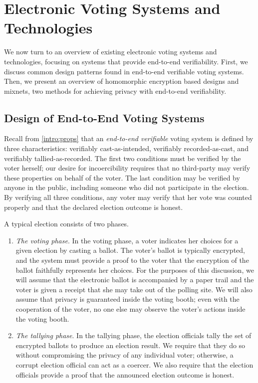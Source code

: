 \chapter{Electronic Voting Systems and Technologies} \label{evote}

We now turn to an overview of existing electronic voting systems and technologies, focusing on systems that provide end-to-end verifiability. First, we discuss common design patterns found in end-to-end verifiable voting systems. Then, we present an overview of homomorphic encryption based designs and mixnets, two methods for achieving privacy with end-to-end verifiability.

\section{Design of End-to-End Voting Systems} \label{evote:design}

Recall from \ref{intro:props} that an \emph{end-to-end verifiable} voting system is defined by three characteristics: verifiably cast-as-intended, verifiably recorded-as-cast, and verifiably tallied-as-recorded. The first two conditions must be verified by the voter herself; our desire for incoercibility requires that no third-party may verify these properties on behalf of the voter. The last condition may be verified by anyone in the public, including someone who did not participate in the election. By verifying all three conditions, any voter may verify that her vote was counted properly and that the declared election outcome is honest.

A typical election consists of two phases.
\begin{enumerate}
\item \emph{The voting phase}. In the voting phase, a voter indicates her choices for a given election by casting a ballot. The voter's ballot is typically encrypted, and the system must provide a proof to the voter that the encryption of the ballot faithfully represents her choices. For the purposes of this discussion, we will assume that the electronic ballot is accompanied by a paper trail and the voter is given a receipt that she may take out of the polling site. We will also assume that privacy is guaranteed inside the voting booth; even with the cooperation of the voter, no one else may observe the voter's actions inside the voting booth.
\item \emph{The tallying phase}. In the tallying phase, the election officials tally the set of encrypted ballots to produce an election result. We require that they do so without compromising the privacy of any individual voter; otherwise, a corrupt election official can act as a coercer. We also require that the election officials provide a proof that the announced election outcome is honest.
\end{enumerate}

